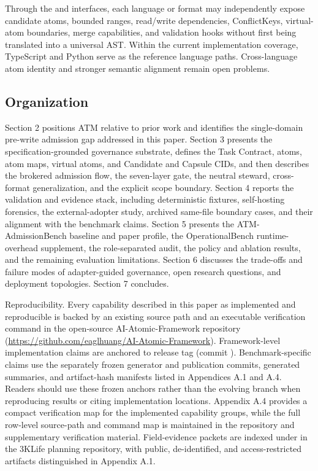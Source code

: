 \documentclass[9pt,letterpaper]{extarticle}
\begin{document}
Through the \texttt{} and \texttt{} interfaces, each language or format may independently expose candidate atoms, bounded ranges, read/write dependencies, ConflictKeys, virtual-atom boundaries, merge capabilities, and validation hooks without first being translated into a universal AST. Within the current implementation coverage, TypeScript and Python serve as the reference language paths. Cross-language atom identity and stronger semantic alignment remain open problems.

\subsection{Organization}

Section 2 positions ATM relative to prior work and identifies the single-domain pre-write admission gap addressed in this paper. Section 3 presents the specification-grounded governance substrate, defines the Task Contract, atoms, atom maps, virtual atoms, and Candidate and Capsule CIDs, and then describes the brokered admission flow, the seven-layer gate, the neutral steward, cross-format generalization, and the explicit scope boundary. Section 4 reports the validation and evidence stack, including deterministic fixtures, self-hosting forensics, the external-adopter study, archived same-file boundary cases, and their alignment with the benchmark claims. Section 5 presents the ATM-AdmissionBench baseline and paper profile, the OperationalBench runtime-overhead supplement, the role-separated audit, the policy and ablation results, and the remaining evaluation limitations. Section 6 discusses the trade-offs and failure modes of adapter-guided governance, open research questions, and deployment topologies. Section 7 concludes.

Reproducibility. Every capability described in this paper as implemented and reproducible is backed by an existing source path and an executable verification command in the open-source AI-Atomic-Framework repository (\url{https://github.com/eaglhuang/AI-Atomic-Framework}). Framework-level implementation claims are anchored to release tag \texttt{} (commit \texttt{}). Benchmark-specific claims use the separately frozen generator and publication commits, generated summaries, and artifact-hash manifests listed in Appendices A.1 and A.4. Readers should use these frozen anchors rather than the evolving \texttt{} branch when reproducing results or citing implementation locations. Appendix A.4 provides a compact verification map for the implemented capability groups, while the full row-level source-path and command map is maintained in the repository and supplementary verification material. Field-evidence packets are indexed under \texttt{} in the 3KLife planning repository, with public, de-identified, and access-restricted artifacts distinguished in Appendix A.1.
\end{document}
